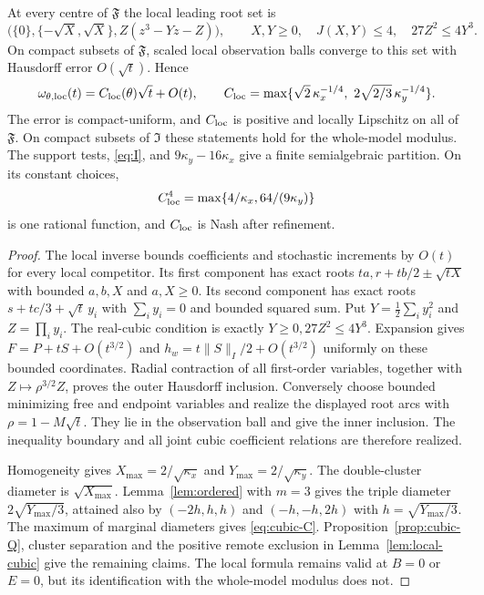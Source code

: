 \begin{theorem}\label{thm:cubic-local}
At every centre of $\mathfrak F$ the local leading root set is
\begin{equation}\label{eq:cubic-leading}
 \bigl(\{0\},\{-\sqrt X,\sqrt X\},Z(z^3-Yz-Z)\bigr),\qquad
 X,Y\ge0,\quad J(X,Y)\le4,\quad27Z^2\le4Y^3.
\end{equation}
On compact subsets of $\mathfrak F$, scaled local observation balls
converge to this set with Hausdorff error $O(\sqrt t)$. Hence
\begin{equation}\label{eq:cubic-C}
 \omega_{\theta,\loc}(t)=C_{\loc}(\theta)\sqrt t+O(t),\qquad
 C_{\loc}=\max\{\sqrt2\,\kappa_x^{-1/4},\ 2\sqrt{2/3}\,\kappa_y^{-1/4}\}.
\end{equation}
The error is compact-uniform, and $C_{\mathrm{loc}}$ is positive and locally
Lipschitz on all of $\mathfrak F$. On compact subsets of $\mathfrak I$
these statements hold for the whole-model modulus. The support tests,
\eqref{eq:I}, and $9\kappa_y-16\kappa_x$ give a finite semialgebraic
partition. On its constant choices,
\[
 C_{\mathrm{loc}}^4=\max\{4/\kappa_x,64/(9\kappa_y)\}
\]
is one rational function, and $C_{\mathrm{loc}}$ is Nash after refinement.
\end{theorem}
\begin{proof}
The local inverse bounds coefficients and stochastic increments by
$O(t)$ for every local competitor. Its first component has exact roots
$ta,r+tb/2\pm\sqrt{tX}$ with bounded $a,b,X$ and $a,X\ge0$.
Its second component has exact roots $s+tc/3+\sqrt t\,y_i$ with
$\sum_i y_i=0$ and bounded squared sum. Put
$Y=\tfrac12\sum_i y_i^2$ and $Z=\prod_i y_i$. The real-cubic condition
is exactly $Y\ge0,27Z^2\le4Y^3$. Expansion gives
$F=P+tS+O(t^{3/2})$ and $h_w=t\|S\|_I/2+O(t^{3/2})$ uniformly on
these bounded coordinates. Radial contraction of all first-order
variables, together with $Z\mapsto\rho^{3/2}Z$, proves the outer
Hausdorff inclusion. Conversely choose bounded minimizing free and
endpoint variables and realize the displayed root arcs with
$\rho=1-M\sqrt t$. They lie in the observation ball and give the inner
inclusion. The inequality boundary and all joint cubic coefficient
relations are therefore realized.

Homogeneity gives $X_{\max}=2/\sqrt{\kappa_x}$ and
$Y_{\max}=2/\sqrt{\kappa_y}$. The double-cluster diameter is
$\sqrt{X_{\max}}$. Lemma~\ref{lem:ordered} with $m=3$ gives the triple
diameter $2\sqrt{Y_{\max}/3}$, attained also by
$(-2h,h,h)$ and $(-h,-h,2h)$ with $h=\sqrt{Y_{\max}/3}$.
The maximum of marginal diameters gives \eqref{eq:cubic-C}.
Proposition~\ref{prop:cubic-Q}, cluster separation and the positive
remote exclusion in Lemma~\ref{lem:local-cubic} give the remaining
claims. The local formula remains valid at $B=0$ or $E=0$, but its
identification with the whole-model modulus does not.
\end{proof}

